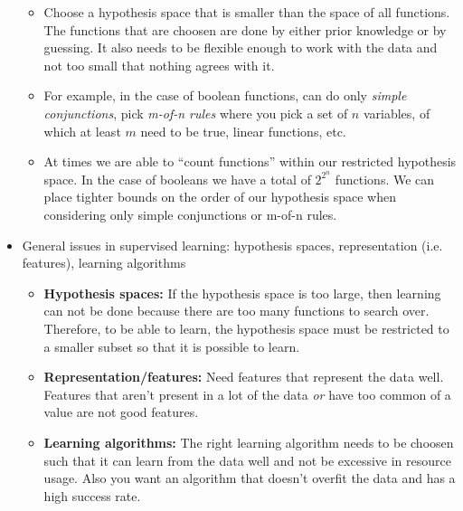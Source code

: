 \documentclass{article}
\begin{document}
\begin{itemize}
	\begin{itemize}
	\item Choose a hypothesis space that is smaller than the space of all functions. The functions that are choosen are done by either prior knowledge or by guessing. It also needs to be flexible enough to work with the data and not too small that nothing agrees with it.
	\item For example, in the case of boolean functions, can do only {\em simple conjunctions}, pick {\em m-of-n rules} where you pick a set of $n$ variables, of which at least $m$ need to be true, linear functions, etc.
	\item At times we are able to ``count functions'' within our restricted hypothesis space. In the case of booleans we have a total of $2^{2^n}$ functions. We can place tighter bounds on the order of our hypothesis space when considering only simple conjunctions or m-of-n rules.
	\end{itemize}
\item General issues in supervised learning: hypothesis spaces, representation (i.e. features), learning algorithms
	\begin{itemize}
	\item {\bf Hypothesis spaces:} If the hypothesis space is too large, then learning can not be done because there are too many functions to search over. Therefore, to be able to learn, the hypothesis space must be restricted to a smaller subset so that it is possible to learn.
	\item {\bf Representation/features:} Need features that represent the data well. Features that aren't present in a lot of the data {\em or} have too common of a value are not good features.
	\item {\bf Learning algorithms:} The right learning algorithm needs to be choosen such that it can learn from the data well and not be excessive in resource usage. Also you want an algorithm that doesn't overfit the data and has a high success rate.
	\end{itemize}
\end{itemize}
\end{document}
